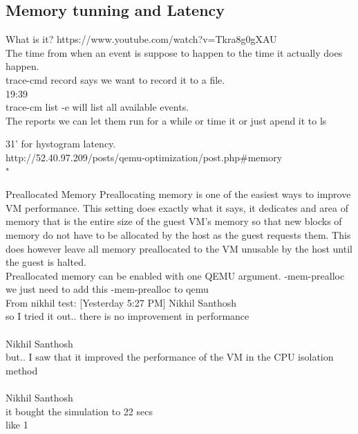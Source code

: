 \documentclass[11pt, a4paper, oneside]{article}
\theoremstyle{definition}
\begin{document}
\subsection{Memory tunning and Latency}
What is it? https://www.youtube.com/watch?v=Tkra8g0gXAU\\
The time from when an event is suppose to happen to the time it actually does happen.\\

trace-cmd record says we want to record it to a file.\\ 
19:39\\
trace-cm list -e will list all available events.\\

The reports we can let them run for a while or time it or just apend it to ls

31' for hystogram latency.\\

http://52.40.97.209/posts/qemu-optimization/post.php$\#$memory\\

"

Preallocated Memory
Preallocating memory is one of the easiest ways to improve VM performance. This setting does exactly what it says, it dedicates and area of memory that is the entire size of the guest VM's memory so that new blocks of memory do not have to be allocated by the host as the guest requests them. This does however leave all memory preallocated to the VM unusable by the host until the guest is halted.\\

Preallocated memory can be enabled with one QEMU argument. -mem-prealloc\\

we just need to add this -mem-prealloc to qemu\\

From nikhil test:
[Yesterday 5:27 PM] Nikhil Santhosh\\
so I tried it out.. there is no improvement in performance\\
\\
Nikhil Santhosh\\
but.. I saw that it improved the performance of the VM in the CPU isolation method\\
\\
Nikhil Santhosh\\
it bought the simulation to 22 secs\\
 like 1\\
\end{document}
